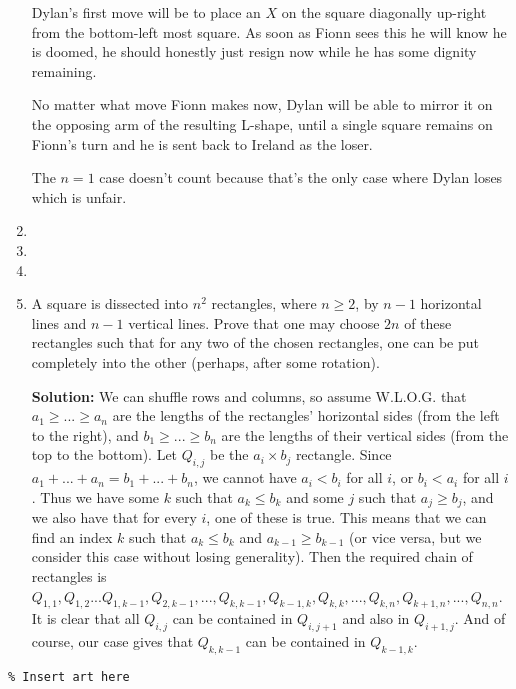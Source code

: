\documentclass{article}
\begin{document}
\begin{enumerate}[itemsep=\fill]
Dylan's first move will be to place an $X$ on the square diagonally up-right from the bottom-left most square. As soon as Fionn sees this he will know he is doomed, he should honestly just resign now while he has some dignity remaining.

No matter what move Fionn makes now, Dylan will be able to mirror it on the opposing arm of the resulting L-shape, until a single square remains on Fionn's turn and he is sent back to Ireland as the loser.

The $n=1$ case doesn't count because that's the only case where Dylan loses which is unfair.


\item %


\item %


\item %

\item %
A square is dissected into $n^2$ rectangles, where $n\geq 2$, by $n-1$ horizontal lines and $n-1$ vertical lines. Prove that one may choose $2n$ of these rectangles such that for any two of the chosen rectangles, one can be put completely into the other (perhaps, after some rotation).

\textbf{Solution:} We can shuffle rows and columns, so assume W.L.O.G. that $a_1\geq ... \geq a_n$ are the lengths of the rectangles' horizontal sides (from the left to the right), and $b_1\geq ...\geq b_n$ are the lengths of their vertical sides (from the top to the bottom). Let $Q_{i,j}$ be the $a_i\times b_j$ rectangle. Since $a_1+...+a_n=b_1+...+b_n$, we cannot have $a_i<b_i$ for all $i$, or $b_i<a_i$ for all $i$. Thus we have some $k$ such that $a_k\leq b_k$ and some $j$ such that $a_j\geq b_j$, and we also have that for every $i$, one of these is true. This means that we can find an index $k$ such that $a_k\leq b_k$ and $a_{k-1}\geq b_{k-1}$ (or vice versa, but we consider this case without losing generality). Then the required chain of rectangles is $Q_{1,1},Q_{1,2}...Q_{1,k-1},Q_{2,k-1},...,Q_{k,k-1},Q_{k-1,k},Q_{k,k},...,Q_{k,n},Q_{k+1,n},...,Q_{n,n}$. It is clear that all $Q_{i,j}$ can be contained in $Q_{i,j+1}$ and also in $Q_{i+1,j}$. And of course, our case gives that $Q_{k,k-1}$ can be contained in $Q_{k-1,k}$.


\end{enumerate}


\centering
\small
\begin{BVerbatim}
\end{BVerbatim}
\end{document}
